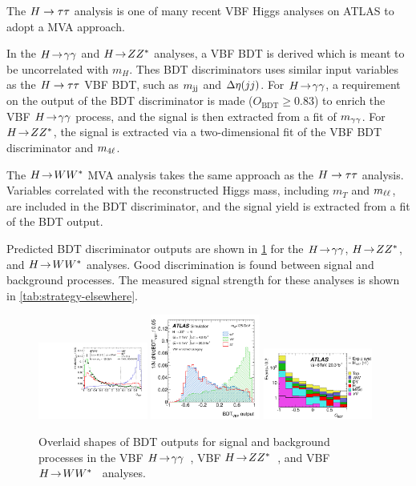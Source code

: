 The $H\rightarrow\tau\tau$ analysis is one of many recent VBF Higgs analyses on ATLAS to adopt a MVA approach.

In the $H \!\rightarrow\! \gamma\gamma$ and $H \!\rightarrow\! ZZ^\ast$ analyses, a VBF BDT is derived which is meant to be uncorrelated with $m_H$. Thes BDT discriminators uses similar input variables as the $H\rightarrow\tau\tau$ VBF BDT, such as $m_{\text{jj}}$ and $\deta$. For $H \!\rightarrow\! \gamma\gamma$, a requirement on the output of the BDT discriminator is made ($O_\text{BDT} \ge 0.83$) to enrich the VBF $H \!\rightarrow\! \gamma\gamma$ process, and the signal is then extracted from a fit of $m_{\gamma\gamma}$. For $H \!\rightarrow\! ZZ^\ast$, the signal is extracted via a two-dimensional fit of the VBF BDT discriminator and $m_{4\ell}$.

The $H \!\rightarrow\! WW^\ast$ MVA analysis takes the same approach as the $H\rightarrow\tau\tau$ analysis. Variables correlated with the reconstructed Higgs mass, including $m_T$ and $m_{\ell\ell}$, are included in the BDT discriminator, and the signal yield is extracted from a fit of the BDT output. 

Predicted BDT discriminator outputs are shown in \cref{fig:strategy-elsewhere} for the $H \!\rightarrow\! \gamma\gamma$, $H \!\rightarrow\! ZZ^\ast$, and $H \!\rightarrow\! WW^\ast$ analyses. Good discrimination is found between signal and background processes. The measured signal strength for these analyses is shown in \cref{tab:strategy-elsewhere}.

\begin{figure}[tp]
  \centering
  \includegraphics[width=0.32\textwidth]{figures/HIGG-2013-08/fig_06}
  \includegraphics[width=0.32\textwidth]{figures/HIGG-2013-21/fig_09f}
  \includegraphics[width=0.32\textwidth]{figures/HIGG-2013-13/fig_46a}
  \caption{Overlaid shapes of BDT outputs for signal and background processes in the VBF $H \!\rightarrow\! \gamma\gamma$~\cite{HIGG-2013-08}, VBF $H \!\rightarrow\! ZZ^\ast$~\cite{HIGG-2013-21}, and VBF $H \!\rightarrow\! WW^\ast$~\cite{HIGG-2013-13} analyses.}
  \label{fig:strategy-elsewhere}
\end{figure}

